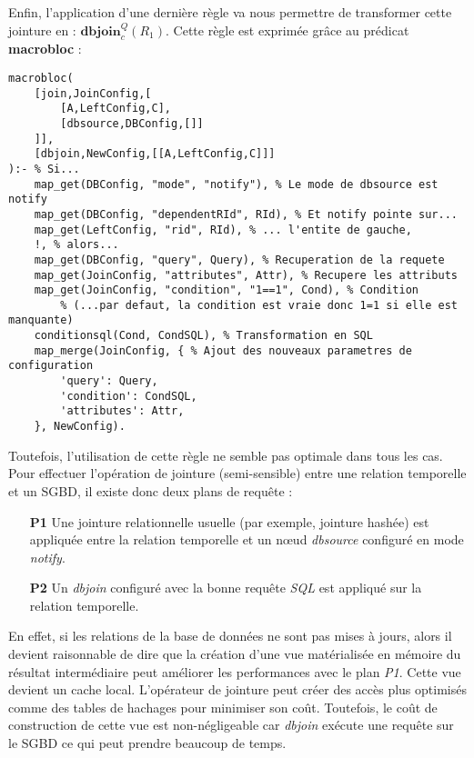 Enfin, l'application d'une dernière règle va nous permettre de transformer cette jointure en : $\textbf{dbjoin}^Q_c (R_1)$. Cette règle est exprimée grâce au prédicat \textbf{macrobloc} :

\begin{lstlisting}
macrobloc(
    [join,JoinConfig,[
        [A,LeftConfig,C],
        [dbsource,DBConfig,[]]
    ]],
    [dbjoin,NewConfig,[[A,LeftConfig,C]]]
):- % Si...
    map_get(DBConfig, "mode", "notify"), % Le mode de dbsource est notify
    map_get(DBConfig, "dependentRId", RId), % Et notify pointe sur...
    map_get(LeftConfig, "rid", RId), % ... l'entite de gauche,
    !, % alors...
    map_get(DBConfig, "query", Query), % Recuperation de la requete
    map_get(JoinConfig, "attributes", Attr), % Recupere les attributs
    map_get(JoinConfig, "condition", "1==1", Cond), % Condition
        % (...par defaut, la condition est vraie donc 1=1 si elle est manquante)
    conditionsql(Cond, CondSQL), % Transformation en SQL
    map_merge(JoinConfig, { % Ajout des nouveaux parametres de configuration
        'query': Query,
        'condition': CondSQL, 
        'attributes': Attr,
    }, NewConfig).
\end{lstlisting}

Toutefois, l'utilisation de cette règle ne semble pas optimale dans tous les cas. Pour effectuer l'opération de jointure (semi-sensible) entre une relation temporelle et un SGBD, il existe donc deux plans de requête :
\begin{itemize}
    \item[\textbf{P1}] Une jointure relationnelle usuelle (par exemple, jointure hashée) est appliquée entre la relation temporelle et un nœud \textit{dbsource} configuré en mode \textit{notify}.
    \item[\textbf{P2}] Un \textit{dbjoin} configuré avec la bonne requête \textit{SQL} est appliqué sur la relation temporelle.
\end{itemize}

En effet, si les relations de la base de données ne sont pas mises à jours, alors il devient raisonnable de dire que la création d'une vue matérialisée en mémoire du résultat intermédiaire peut améliorer les performances avec le plan \textit{P1}. Cette vue devient un cache local. L'opérateur de jointure peut créer des accès plus optimisés comme des tables de hachages pour minimiser son coût. Toutefois, le coût de construction de cette vue est non-négligeable car \textit{dbjoin} exécute une requête sur le SGBD ce qui peut prendre beaucoup de temps.

